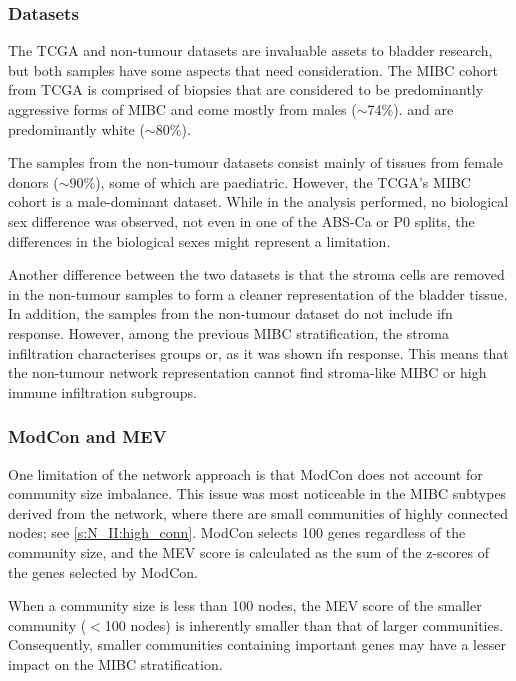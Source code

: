 \subsubsection*{Datasets}

The TCGA and non-tumour datasets are invaluable assets to bladder research, but both samples have some aspects that need consideration. The MIBC cohort from TCGA is comprised of biopsies that are considered to be predominantly aggressive forms of MIBC and come mostly from males (\(\sim\)74\%). and are predominantly white (\(\sim\)80\%).

The samples from the non-tumour datasets consist mainly of tissues from female donors (\(\sim\)90\%), some of which are paediatric. However, the TCGA's MIBC cohort is a male-dominant dataset. While in the analysis performed, no biological sex difference was observed, not even in one of the ABS-Ca or P0 splits, the differences in the biological sexes might represent a limitation.

Another difference between the two datasets is that the stroma cells are removed in the non-tumour samples to form a cleaner representation of the bladder tissue. In addition, the samples from the non-tumour dataset do not include \acrlong{ifn} response. However, among the previous MIBC stratification, the stroma infiltration characterises groups or, as it was shown \acrshort{ifn} response. This means that the non-tumour network representation cannot find stroma-like MIBC or high immune infiltration subgroups.


\subsubsection*{ModCon and MEV}

One limitation of the network approach is that ModCon does not account for community size imbalance. This issue was most noticeable in the MIBC subtypes derived from the network, where there are small communities of highly connected nodes; see \cref{s:N_II:high_conn}. ModCon selects 100 genes regardless of the community size, and the MEV score is calculated as the sum of the z-scores of the genes selected by ModCon.

When a community size is less than 100 nodes, the MEV score of the smaller community (\(<\)100 nodes) is inherently smaller than that of larger communities. Consequently, smaller communities containing important genes may have a lesser impact on the MIBC stratification.


